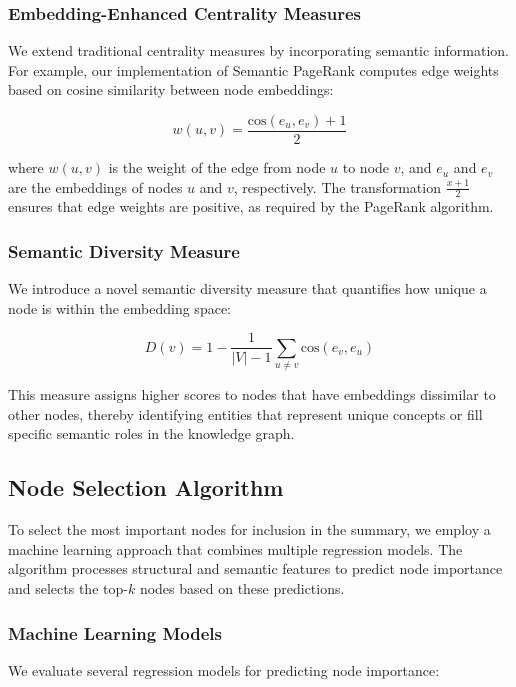 \documentclass[article,submit,pdftex,moreauthors]{Definitions/mdpi}
\begin{document}
\subsubsection{Embedding-Enhanced Centrality Measures}
We extend traditional centrality measures by incorporating semantic information. For example, our implementation of Semantic PageRank computes edge weights based on cosine similarity between node embeddings:

\begin{equation}
    w(u, v) = \frac{\text{cos}(e_u, e_v) + 1}{2}
\end{equation}

where $w(u, v)$ is the weight of the edge from node $u$ to node $v$, and $e_u$ and $e_v$ are the embeddings of nodes $u$ and $v$, respectively. The transformation $\frac{x+1}{2}$ ensures that edge weights are positive, as required by the PageRank algorithm.

\subsubsection{Semantic Diversity Measure}
We introduce a novel semantic diversity measure that quantifies how unique a node is within the embedding space:

\begin{equation}
    D(v) = 1 - \frac{1}{|V|-1} \sum_{u \neq v} \text{cos}(e_v, e_u)
\end{equation}

This measure assigns higher scores to nodes that have embeddings dissimilar to other nodes, thereby identifying entities that represent unique concepts or fill specific semantic roles in the knowledge graph.

\subsection{Node Selection Algorithm}
To select the most important nodes for inclusion in the summary, we employ a machine learning approach that combines multiple regression models. The algorithm processes structural and semantic features to predict node importance and selects the top-$k$ nodes based on these predictions.

\subsubsection{Machine Learning Models}
We evaluate several regression models for predicting node importance:
\end{document}
